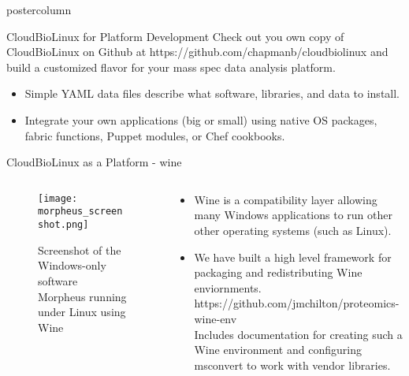 \documentclass[final]{beamer}
\begin{document}
\begin{frame}
\begin{columns}
\begin{column}{.5\textwidth}
\begin{beamercolorbox}[center,wd=\textwidth]{postercolumn}
\begin{minipage}[T]{.95\textwidth}
{\begin{block}{CloudBioLinux for Platform Development}
            Check out you own copy of CloudBioLinux on Github at
            https://github.com/chapmanb/cloudbiolinux and build a customized
            flavor for your mass spec data analysis platform.

            \begin{itemize}
            \item Simple YAML data files describe what software, libraries, 
            and data to install.

            \item Integrate your own applications (big or small) using native OS
            packages, fabric functions, Puppet modules, or Chef cookbooks.
            \end{itemize}

            \end{block}

            \vfill
            
            \begin{block}{CloudBioLinux as a Platform - wine}

              \begin{columns}
                \begin{column}{.40\textwidth}
                  \begin{figure}
                    \texttt{[image: morpheus\_screenshot.png]} 
                    \caption{Screenshot of the Windows-only software Morpheus running under Linux using Wine}
                  \end{figure}
                \end{column}
                \begin{column}{.59\textwidth}
                  \begin{itemize}

            \item Wine is a compatibility layer allowing many Windows applications
            to run other other operating systems (such as Linux). 
            
            \item We have built a high level framework for packaging and
            redistributing Wine enviornments. https://github.com/jmchilton/proteomics-wine-env \hfill \\


            \hskip2cm Includes documentation for creating such a Wine environment
            and configuring msconvert to work with vendor libraries.


\end{itemize}
\end{column}
\end{columns}
\end{block}}
\end{minipage}
\end{beamercolorbox}
\end{column}
\end{columns}
\end{frame}
\end{document}
